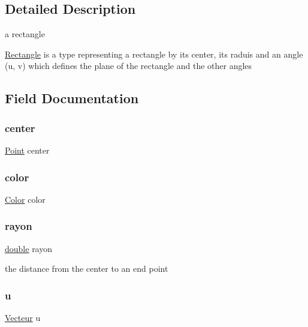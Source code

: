 \subsection{Detailed Description}
a rectangle 

\hyperlink{struct_rectangle}{Rectangle} is a type representing a rectangle by its center, its raduis and an angle (u, v) which defines the plane of the rectangle and the other angles 

\subsection{Field Documentation}
\mbox{\label{struct_rectangle_a24bb1c337bce91dd3e7a4a4372b11793}} 
\subsubsection{\texorpdfstring{center}{center}}
{\footnotesize\ttfamily \hyperlink{struct_point}{Point} center}

\mbox{\label{struct_rectangle_aa5f4d1eda21c196bd8401ff73f105073}} 
\subsubsection{\texorpdfstring{color}{color}}
{\footnotesize\ttfamily \hyperlink{struct_color}{Color} color}

\mbox{\label{struct_rectangle_a2459aedac9f8646ad9566164a9a83f41}} 
\subsubsection{\texorpdfstring{rayon}{rayon}}
{\footnotesize\ttfamily \hyperlink{g3x__transfo_8h_a89b2b23e407882a535d835574a7912e1}{double} rayon}

the distance from the center to an end point \mbox{\label{struct_rectangle_a5aa1600754aceabfee725fb390410687}} 
\subsubsection{\texorpdfstring{u}{u}}
{\footnotesize\ttfamily \hyperlink{struct_vecteur}{Vecteur} u}

